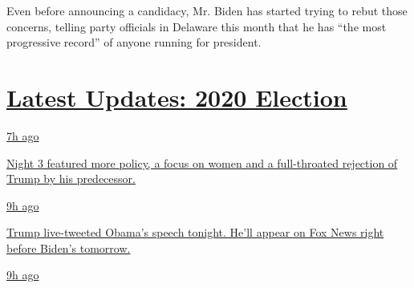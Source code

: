 Even before announcing a candidacy, Mr. Biden has started trying to
rebut those concerns, telling party officials in Delaware this month
that he has ``the most progressive record'' of anyone running for
president.

\hypertarget{latest-updates-2020-election}{%
\section{\texorpdfstring{\href{https://www.nytimes3xbfgragh.onion/live/2020/08/19/us/dnc-convention-election?action=click\&pgtype=Article\&state=default\&region=MAIN_CONTENT_1\&context=storylines_live_updates}{Latest
Updates: 2020
Election}}{Latest Updates: 2020 Election}}\label{latest-updates-2020-election}}

\href{https://www.nytimes3xbfgragh.onion/live/2020/08/19/us/dnc-convention-election?action=click\&pgtype=Article\&state=default\&region=MAIN_CONTENT_1\&context=storylines_live_updates\#night-3-featured-more-policy-a-focus-on-women-and-a-full-throated-rejection-of-trump-by-his-predecessor}{7h
ago}

\href{https://www.nytimes3xbfgragh.onion/live/2020/08/19/us/dnc-convention-election?action=click\&pgtype=Article\&state=default\&region=MAIN_CONTENT_1\&context=storylines_live_updates\#night-3-featured-more-policy-a-focus-on-women-and-a-full-throated-rejection-of-trump-by-his-predecessor}{Night
3 featured more policy, a focus on women and a full-throated rejection
of Trump by his predecessor.}

\href{https://www.nytimes3xbfgragh.onion/live/2020/08/19/us/dnc-convention-election?action=click\&pgtype=Article\&state=default\&region=MAIN_CONTENT_1\&context=storylines_live_updates\#trump-live-tweeted-obamas-speech-tonight-hell-appear-on-fox-news-right-before-bidens-tomorrow}{9h
ago}

\href{https://www.nytimes3xbfgragh.onion/live/2020/08/19/us/dnc-convention-election?action=click\&pgtype=Article\&state=default\&region=MAIN_CONTENT_1\&context=storylines_live_updates\#trump-live-tweeted-obamas-speech-tonight-hell-appear-on-fox-news-right-before-bidens-tomorrow}{Trump
live-tweeted Obama's speech tonight. He'll appear on Fox News right
before Biden's tomorrow.}

\href{https://www.nytimes3xbfgragh.onion/live/2020/08/19/us/dnc-convention-election?action=click\&pgtype=Article\&state=default\&region=MAIN_CONTENT_1\&context=storylines_live_updates\#advocates-for-domestic-violence-survivors-praised-biden-in-a-video}{9h
ago}

